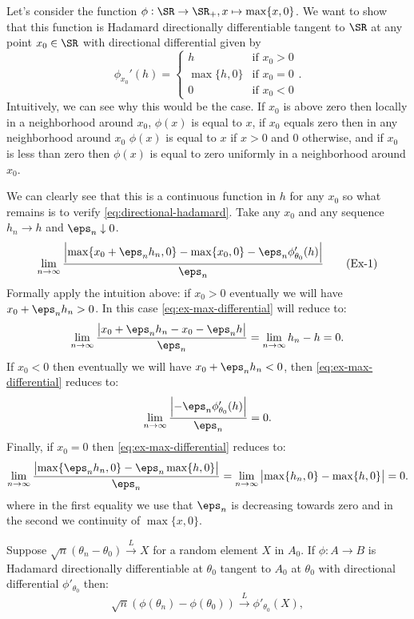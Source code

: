 \begin{example}
	\label{ex:max-directional-differential}
	Let's consider the function \(\phi:\SR\to\SR_+, x\mapsto \max\{x,0\}\). We want to show that this function is Hadamard directionally differentiable tangent to \(\SR\) at any point \(x_0\in\SR\) with directional differential given by 
	\[
		\phi_{x_0}'(h) = \begin{cases}
			h & \text{if } x_0 > 0 \\
			\max\{h,0\} &\text{if } x_0=0\\
			0 & \text{if } x_0 < 0
		\end{cases}
	.\] 
	Intuitively, we can see why this would be the case. If \(x_0\) is above zero then locally in a neighborhood around \(x_0\), \(\phi(x)\) is equal to \(x\), if \(x_0\) equals zero then in any neighborhood around \(x_0\) \(\phi(x)\) is equal to \(x\) if \(x > 0\) and \(0\) otherwise, and if \(x_0\) is less than zero then \(\phi(x)\) is equal to zero uniformly in a neighborhood around \(x_0\).

	We can clearly see that this is a continuous function in \(h\) for any \(x_0\) so what remains is to verify \cref{eq:directional-hadamard}. Take any \(x_0\) and any sequence \(h_n\to h\) and \(\eps_n\downarrow 0\).
	\begin{align}
		\label{eq:ex-max-differential}
		\lim_{n\to\infty}\frac{\left|\max\{x_0 + \eps_nh_n, 0\} - \max\{x_0,0\} - \eps_n \phi_{\theta_0}'(h)\right|}{\eps_n}\tag{Ex-1}
	\end{align}
	Formally apply the intuition above: if \(x_0 > 0\) eventually we will have \(x_0 + \eps_nh_n > 0\). In this case \eqref{eq:ex-max-differential} will reduce to:
	\[
		\lim_{n\to\infty}\frac{\left|x_0 + \eps_nh_n - x_0 - \eps_n h\right|}{\eps_n} = \lim_{n\to\infty} h_n - h = 0 
	.\]
	If \(x_0 < 0\) then eventually we will have \(x_0 + \eps_nh_n <0\), then \eqref{eq:ex-max-differential} reduces to: 
	\[
		\lim_{n\to\infty} \frac{\left| -\eps_n \phi_{\theta_0}'(h)\right|}{\eps_n} = 0
	.\]
	Finally, if \(x_0 = 0\) then \eqref{eq:ex-max-differential} reduces to:
	\[
		\lim_{n\to\infty} \frac{\left|\max\{\eps_nh_n,0\} - \eps_n\max\{h,0\}\right|}{\eps_n} = \lim_{n\to\infty}\left|\max\{h_n,0\}-\max\{h,0\}\right| =0
	.\] 
	where in the first equality we use that \(\eps_n\) is decreasing towards zero and in the second we continuity of \(\max\{x,0\}\).
\end{example}
\begin{theorem}
	\label{thm:directional-delta-method}
	Suppose \(\sqrt{n}\left(\theta_n - \theta_0\right)\overset{L}{\to}X\) for a random element \(X\) in \(A_0\). If \(\phi:A\to B\) is Hadamard directionally differentiable at \(\theta_0\) tangent to \(A_0\) at \(\theta_0\) with  directional differential \(\phi'_{\theta_0}\) then:
	 \[
		 \sqrt{n}\left(\phi(\theta_n) - \phi(\theta_0)\right)\overset{L}{\to} \phi'_{\theta_0}(X)
	,\] 
\end{theorem}

